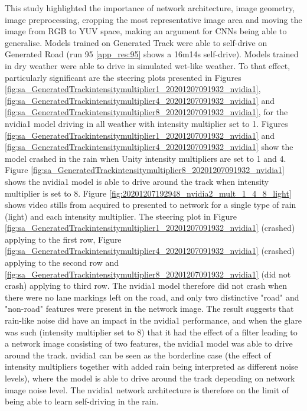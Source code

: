 This study highlighted the importance of network architecture, image geometry, image preprocessing, cropping the most representative image area and moving the image from RGB to YUV space, making an argument for CNNs being able to generalise. Models trained on Generated Track were able to self-drive on Generated Road (run 95 \ref{app_res:95} shows a 16m14s self-drive). Models trained in dry weather were able to drive in simulated wet-like weather. To that effect, particularly significant are the steering plots presented in Figures %
\ref{fig:sa_GeneratedTrackintensitymultiplier1_20201207091932_nvidia1}, \ref{fig:sa_GeneratedTrackintensitymultiplier4_20201207091932_nvidia1} and
\ref{fig:sa_GeneratedTrackintensitymultiplier8_20201207091932_nvidia1}, for the nvidia1 model driving in all weather with intensity multiplier set to 1.
Figures 
\ref{fig:sa_GeneratedTrackintensitymultiplier1_20201207091932_nvidia1} and
\ref{fig:sa_GeneratedTrackintensitymultiplier4_20201207091932_nvidia1} show the model crashed in the rain when Unity intensity multipliers are set to 1 and 4. Figure \ref{fig:sa_GeneratedTrackintensitymultiplier8_20201207091932_nvidia1} shows the nvidia1 model is able to drive around the track when intensity multiplier is set to 8. 
Figure \ref{fig:20201207192948_nvidia2_mult_1_4_8_light} shows video stills from acquired to presented to network for a single type of rain (light) and each intensity multiplier. The steering plot in Figure \ref{fig:sa_GeneratedTrackintensitymultiplier1_20201207091932_nvidia1} (crashed) applying to the first row, Figure \ref{fig:sa_GeneratedTrackintensitymultiplier4_20201207091932_nvidia1} (crashed) applying to the second row and \ref{fig:sa_GeneratedTrackintensitymultiplier8_20201207091932_nvidia1} (did not crash) applying to third row. The nvidia1 model therefore did not crash when there were no lane markings left on the road, and only two distinctive "road" and "non-road" features were present in the network image. The result suggests that rain-like noise did have an impact in the nvidia1 performance, and when the glare was such (intensity multiplier set to 8) that it had the effect of a filter leading to a network image consisting of two features, the nvidia1 model was able to drive around the track. nvidia1 can be seen as the borderline case (the effect of intensity multipliers together with added rain being interpreted as different noise levels), where  the model is able to drive around the track depending on  network image noise level. The nvidia1 network architecture is therefore on the limit of being able to learn self-driving in the rain.
 
